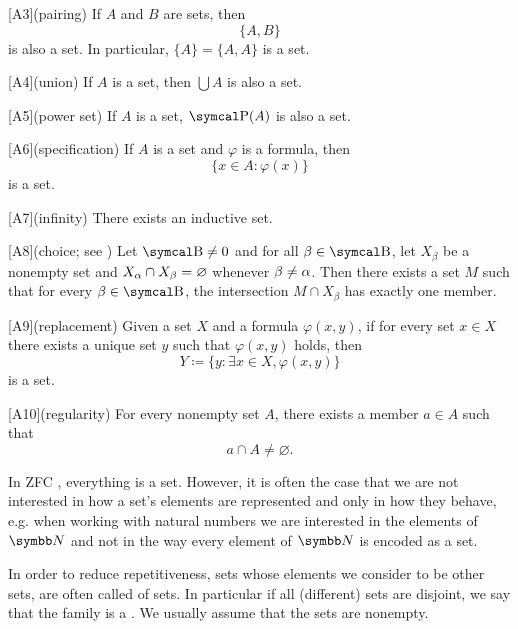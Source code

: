 \begin{definition}
\begin{description}
    [A3](pairing) If \( A \) and \( B \) are sets, then
    \begin{equation*}
      \{ A, B \}
    \end{equation*}
    is also a set. In particular, \( \{ A \} = \{ A, A \} \) is a set.

    [A4](union) If \( A \) is a set, then \( \bigcup A \) is also a set.

    [A5](power set) If \( A \) is a set, \( \Power(A) \) is also a set.

    [A6](specification) If \( A \) is a set and \( \varphi \) is a formula, then
    \begin{equation*}
      \{ x \in A \colon \varphi(x) \}
    \end{equation*}
    is a set.

    [A7](infinity) There exists an inductive set.

    [A8](choice; see ) Let \( \CB \neq 0 \) and for all \( \beta \in \CB \), let \( X_\beta \) be a nonempty set and \( X_\alpha \cap X_\beta = \varnothing \) whenever \( \beta \neq \alpha \). Then there exists a set \( M \) such that for every \( \beta \in \CB \), the intersection \( M \cap X_\beta \) has exactly one member.

    [A9](replacement) Given a set \( X \) and a formula \( \varphi(x, y) \), if for every set \( x \in X \) there exists a unique set \( y \) such that \( \varphi(x, y) \) holds, then
    \begin{equation*}
      Y \coloneqq \{ y \colon \exists x \in X, \varphi(x, y) \}
    \end{equation*}
    is a set.

    [A10](regularity) For every nonempty set \( A \), there exists a member \( a \in A \) such that
    \begin{equation*}
      a \cap A \neq \varnothing.
    \end{equation*}
  \end{description}
\end{definition}

\begin{remark}\label{remark:family_of_sets}
  In ZFC , everything is a set. However, it is often the case that we are not interested in how a set's elements are represented and only in how they behave, e.g. when working with natural numbers we are interested in the elements of \( \BN \) and not in the way every element of \( \BN \) is encoded as a set.

  In order to reduce repetitiveness, sets whose elements we consider to be other sets, are often called  of sets. In particular if all (different) sets are disjoint, we say that the family is a . We usually assume that the sets are nonempty.
\end{remark}

